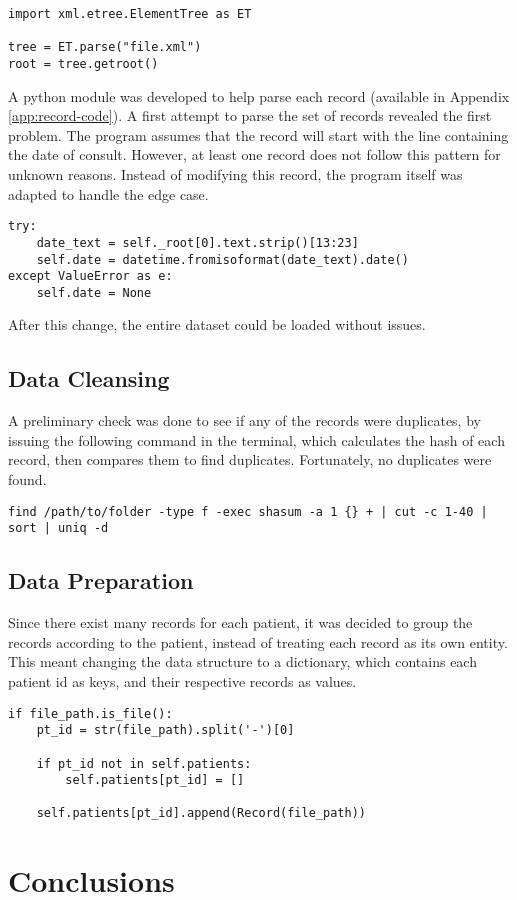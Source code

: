 \documentclass[a4paper,12pt]{article}
\begin{document}
\begin{verbatim}
import xml.etree.ElementTree as ET

tree = ET.parse("file.xml")
root = tree.getroot()
\end{verbatim}

A python module was developed to help parse each record (available in Appendix
\ref{app:record-code}).
A first attempt to parse the set of records revealed the first problem.
The program assumes that the record will start with the line containing the
date of consult.
However, at least one record does not follow this pattern for unknown reasons.
Instead of modifying this record, the program itself was adapted to handle the
edge case.

\begin{verbatim}
try:
    date_text = self._root[0].text.strip()[13:23]
    self.date = datetime.fromisoformat(date_text).date()
except ValueError as e:
    self.date = None
\end{verbatim}

After this change, the entire dataset could be loaded without issues.

\subsection{Data Cleansing}

A preliminary check was done to see if any of the records were duplicates,
by issuing the following command in the terminal, which calculates the
hash of each record, then compares them to find duplicates.
Fortunately, no duplicates were found.

\begin{verbatim}
find /path/to/folder -type f -exec shasum -a 1 {} + | cut -c 1-40 | sort | uniq -d
\end{verbatim}

\subsection{Data Preparation}

Since there exist many records for each patient, it was decided to group the
records according to the patient, instead of treating each record as its own
entity.
This meant changing the data structure to a dictionary, which contains each
patient id as keys, and their respective records as values.

\begin{verbatim}
if file_path.is_file():
    pt_id = str(file_path).split('-')[0]

    if pt_id not in self.patients:
        self.patients[pt_id] = []

    self.patients[pt_id].append(Record(file_path))
\end{verbatim}

\section{Conclusions}

\pagebreak
\printbibliography
\end{document}
